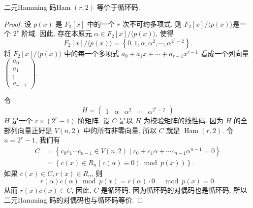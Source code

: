 \begin{theorem}
     二元Hamming 码Ham $ (r, 2) $ 等价于循环码.
\end{theorem}
\begin{proof}
    设 $ p(x) $ 是 $ F_{2}[x] $ 中的一个 $ r $ 次不可约多项式. 则 $ F_{2}[x] /\langle p(x)\rangle $是一个 $ 2^{r} $ 阶域. 因此, 存在本原元 $ \alpha \in F_{2}[x] /\langle p(x)\rangle $, 使得
    $$
F_{2}[x] /\langle p(x)\rangle=\left\{0,1, \alpha, \alpha^{2}, \cdots, \alpha^{2^{r}-2}\right\} .
$$
将 $ F_{2}[x] /\langle p(x)\rangle $ 中的每一个多项式 $ a_{0}+a_{1} x+\cdots+a_{r-1} x^{r-1} $ 看成一个列向量
$
\left(\begin{array}{c}
a_{0} \\
a_{1} \\
\vdots \\
a_{r-1}
\end{array}\right).
$

令
$$
H=\left(\begin{array}{lllll}
1 & \alpha & \alpha^{2} & \cdots & \alpha^{2^{r}-2}
\end{array}\right)
$$
$ H $ 是一个 $ r \times\left(2^{r}-1\right) $ 阶矩阵. 设 $ C $ 是以 $ H $ 为校验矩阵的线性码. 因为 $ H $ 的全部列向量正好是 $ V(n, 2) $ 中的所有非零向量, 所以 $ C $ 就是 $ \operatorname{Ham}(r, 2) $. 令 $ n=2^{r}-1 $, 我们有
$$
\begin{aligned}
C & =\left\{c_{0} c_{1} \cdots c_{n-1} \in V(n, 2) \mid c_{0}+c_{1} \alpha+\cdots c_{n-1} \alpha^{n-1}=0\right\} \\
& =\left\{c(x) \in R_{n} \mid c(\alpha) \equiv 0(\bmod p(x))\right\} .
\end{aligned}
$$
如果 $ c(x) \in C, r(x) \in R_{n} $, 则
$$
r(\alpha) c(\alpha) \bmod p(x)=r(\alpha) \cdot 0 \quad \bmod p(x)=0 .
$$
从而 $ r(x) c(x) \in C $, 因此, $ C $ 是循环码.
因为循环码的对偶码也是循环码, 所以二元Hamming 码的对偶码也与循环码等价.
\end{proof} 














